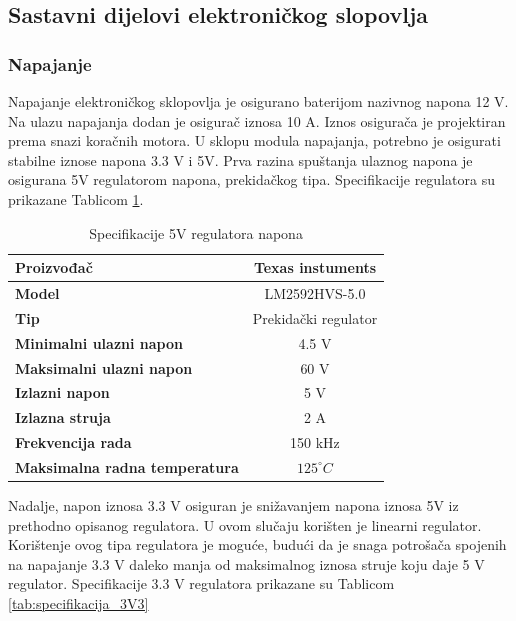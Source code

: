\documentclass[11pt,a4paper]{article}
\begin{document}
\subsection{Sastavni dijelovi elektroničkog slopovlja}

\subsubsection{Napajanje}
Napajanje elektroničkog sklopovlja je osigurano baterijom nazivnog napona 12 V. Na ulazu napajanja dodan je osigurač iznosa 10 A. Iznos osigurača je projektiran prema snazi koračnih motora. U sklopu modula napajanja, potrebno je osigurati stabilne iznose napona 3.3 V i 5V. Prva razina spuštanja ulaznog napona je osigurana 5V regulatorom napona, prekidačkog tipa. Specifikacije regulatora su prikazane Tablicom \ref{tab:specifikacija_5V}.


\begin{table}[H]
	\centering
	\caption{Specifikacije 5V regulatora napona}
	\label{tab:specifikacija_5V}
	\begin{tabular}{|l|c|}
		\hline
		\textbf{Proizvođač} & Texas instuments  \\ \hline 
		\textbf{Model} &  LM2592HVS-5.0  \\ \hline 
		\textbf{Tip} &  Prekidački regulator  \\ \hline 
		\textbf{Minimalni ulazni napon} & 4.5 V \\ \hline 
		\textbf{Maksimalni ulazni napon} & 60 V \\ \hline 
		\textbf{Izlazni napon} & 5 V \\ \hline 
		\textbf{Izlazna struja} & 2 A \\ \hline 
		\textbf{Frekvencija rada} & 150 kHz \\ \hline 
		\textbf{Maksimalna radna temperatura} & $125 ^\circ C$ \\ \hline 
	\end{tabular}
\end{table}

Nadalje, napon iznosa 3.3 V osiguran je snižavanjem napona iznosa 5V iz prethodno opisanog regulatora. U ovom slučaju korišten je linearni regulator. Korištenje ovog tipa regulatora je moguće, budući da je snaga potrošača spojenih na napajanje 3.3 V daleko manja od maksimalnog iznosa struje koju daje 5 V regulator. Specifikacije 3.3 V regulatora prikazane su Tablicom \ref{tab:specifikacija_3V3}
\end{document}
